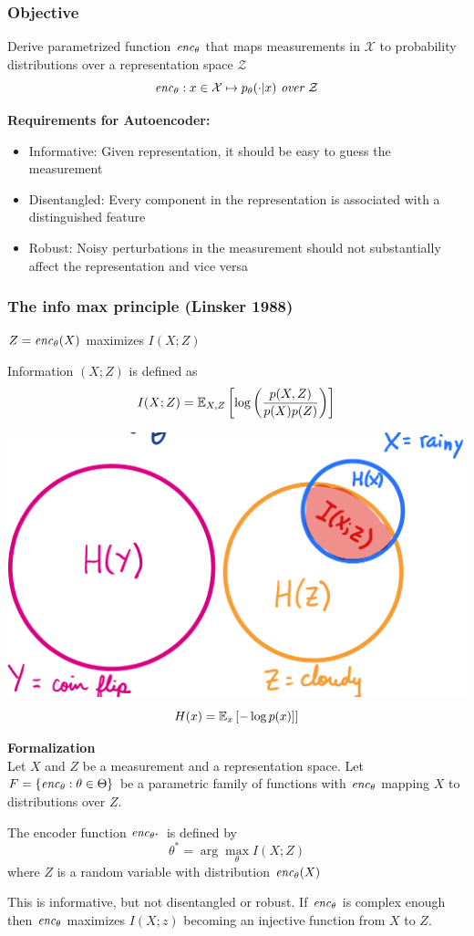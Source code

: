 \subsubsection{Objective}
Derive parametrized function $\mathit{enc}_\theta$ that maps measurements in $\mathcal X$ to probability distributions over a representation space $\mathcal Z$
$$
	\mathit{enc}_\theta: x \in \mathcal X \mapsto p_\theta(\cdot| x) \textit{ over } \mathcal Z 
$$


\textbf{Requirements for Autoencoder:}
\begin{itemize}
	\item Informative: Given representation, it should be easy to guess the measurement
	\item Disentangled: Every component in the representation is associated with a distinguished feature
	\item Robust: Noisy perturbations in the measurement should not substantially affect the representation and vice versa
\end{itemize}

\subsubsection{The info max principle (Linsker 1988)}
$Z = \mathit{enc}_\theta(X)$ maximizes $I(X;Z)$

Information $(X;Z)$ is defined as
$$
	I(X;Z) = \mathbb E_{X,Z}\left[\log\left(\frac{p(X,Z)}{p(X)p(Z)} \right) \right]
$$
\begin{center}
	\includegraphics[width=0.5\columnwidth]{images/11-infomax-principle}
	$$
		H(x) = \mathbb E_x\left[-\log p(x)] \right]
	$$
\end{center}


\begin{minipage}{\columnwidth}
\textbf{Formalization}\\
Let $X$ and $Z$ be a measurement and a representation space. Let $F=\{\mathit{enc}_\theta: \theta \in \Theta \}$ be a parametric family of functions with $\mathit{enc}_\theta$ mapping $X$ to distributions over $Z$.

The encoder function $\mathit{enc}_{\theta^*}$ is defined by 
$$
	\theta^* = \arg\max_\theta I(X; Z)
$$
where $Z$ is a random variable with distribution $\mathit{enc}_\theta(X)$

This is informative, but not disentangled or robust. If $\mathit{enc}_\theta$ is complex enough then $\mathit{enc}_\theta$ maximizes $I(X;z)$ becoming an injective function from $X$ to $Z$.
	
\end{minipage}



